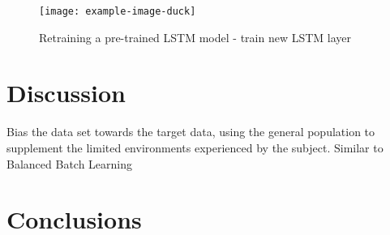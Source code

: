 \begin{figure}[htbp]
    \centering
    \texttt{[image: example-image-duck]}
    \caption[Retraining a pre-trained LSTM model]{Retraining a pre-trained LSTM model - train new LSTM layer}
    \label{fig:ch5_additional_LSTM_layer}
\end{figure}

\section{Discussion}

Bias the data set towards the target data, using the general population to supplement the limited environments experienced by the subject. Similar to Balanced Batch Learning \cite{Cruciani2020}


\section{Conclusions}

